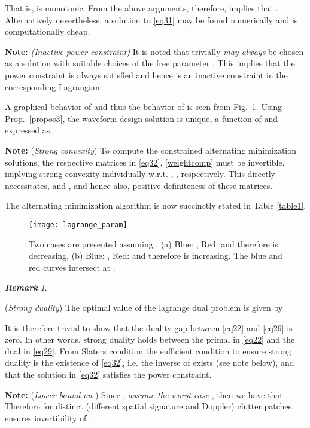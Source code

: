 \documentclass[11pt,draftclsnofoot,onecolumn]{IEEEtran}
\theoremstyle{definition}
\theoremstyle{remark}
\newtheorem{remk}{\bf Remark}
\begin{document}
That is,  is monotonic. From the above arguments, therefore,  implies that  . Alternatively nevertheless, a solution to \eqref{eq31} may be found numerically and is computationally cheap. 

{\bf Note:} {\it (Inactive power constraint)} It is noted that trivially  {\it may always} be chosen as a solution with suitable choices of the free parameter . This implies that the power constraint is always satisfied and hence is an inactive constraint in the corresponding Lagrangian.


A graphical behavior of  and thus the behavior of  is seen from Fig.~\ref{figlagrange}. Using Prop.~\ref{propos3}, the waveform design solution is  unique, a function of  and expressed as,


{\bf Note:} ({\it Strong convexity}) To compute the constrained alternating minimization solutions, the respective matrices in \eqref{eq32}, \eqref{weightcomp} must be invertible, implying strong convexity individually  w.r.t. , , respectively. This directly necessitates,  and , and hence also, positive definiteness of these matrices.

The alternating minimization algorithm is now succinctly stated in Table \ref{table1}.

\begin{figure} [tbp!]
\centering
\texttt{[image: lagrange\_param]}
\caption{Two cases are presented assuming . (a) Blue: , Red:  and therefore  is decreasing, (b)  Blue: , Red:  and therefore  is increasing. The blue and red curves intersect at .}
\label{figlagrange}
\end{figure}

\begin{remk}\label{dualprop}

({\it Strong duality}) The optimal value of the lagrange dual problem is given by

It is therefore trivial to show that the duality gap between \eqref{eq22} and \eqref{eq29} is zero.
 In other words, strong duality holds between the primal in \eqref{eq22} and the dual in \eqref{eq29}. From Slaters condition \cite{Boyd2004} the sufficient condition to ensure strong duality is the existence of \eqref{eq32}, i.e. the inverse of  exists (see note below), and that the solution in \eqref{eq32} satisfies the power constraint.
\end{remk}


{\bf Note:} ({\it Lower bound on }) Since , {\it assume the worst case} , then we have that . Therefore for  distinct  (different spatial signature and Doppler) clutter patches,  ensures invertibility of .
\end{document}
